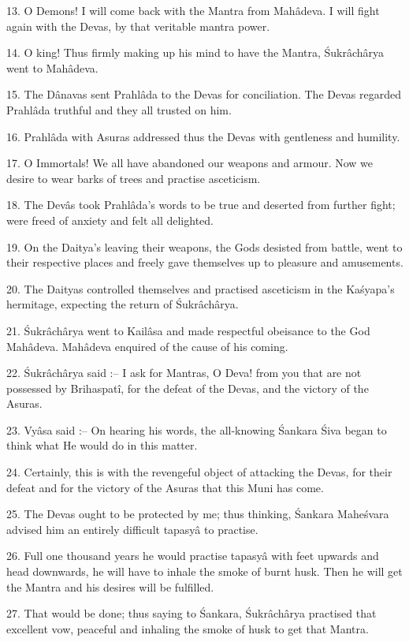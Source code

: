 13. O Demons! I will come back with the Mantra from Mah\^adeva. I will fight again with the Devas, by that veritable mantra power.

14. O king! Thus firmly making up his mind to have the Mantra, \'Sukr\^ach\^arya went to Mah\^adeva.

15. The D\^anavas sent Prahl\^ada to the Devas for conciliation. The Devas regarded Prahl\^ada truthful and they all trusted on him.

16. Prahl\^ada with Asuras addressed thus the Devas with gentleness and humility.

17. O Immortals! We all have abandoned our weapons and armour. Now we desire to wear barks of trees and practise asceticism.

18. The Dev\^as took Prahl\^ada's words to be true and deserted from further fight; were freed of anxiety and felt all delighted.

19. On the Daitya's leaving their weapons, the Gods desisted from battle, went to their respective places and freely gave themselves up to pleasure and amusements.

20. The Daityas controlled themselves and practised asceticism in the Ka\'syapa's hermitage, expecting the return of \'Sukr\^ach\^arya.

21. \'Sukr\^ach\^arya went to Kail\^asa and made respectful obeisance to the God Mah\^adeva. Mah\^adeva enquired of the cause of his coming.

22. \'Sukr\^ach\^arya said :-- I ask for Mantras, O Deva! from you that are not possessed by Brihaspat\^i, for the defeat of the Devas, and the victory of the Asuras.

23. Vy\^asa said :-- On hearing his words, the all-knowing \'Sankara \'Siva began to think what He would do in this matter.

24. Certainly, this is with the revengeful object of attacking the Devas, for their defeat and for the victory of the Asuras that this Muni has come.

25. The Devas ought to be protected by me; thus thinking, \'Sankara Mahe\'svara advised him an entirely difficult tapasy\^a to practise.

26. Full one thousand years he would practise tapasy\^a with feet upwards and head downwards, he will have to inhale the smoke of burnt husk. Then he will get the Mantra and his desires will be fulfilled.

27. That would be done; thus saying to \'Sankara, \'Sukr\^ach\^arya practised that excellent vow, peaceful and inhaling the smoke of husk to get that Mantra.

